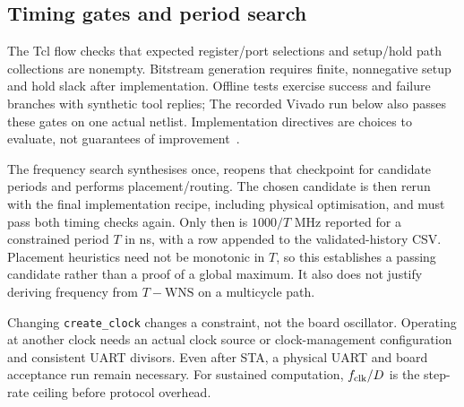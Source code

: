 \subsection{Timing gates and period search}
\label{sec:fmax}

The Tcl flow checks that expected register/port selections and setup/hold
path collections are nonempty. Bitstream generation requires finite,
nonnegative setup and hold slack after implementation. Offline tests exercise
success and failure branches with synthetic tool replies; The recorded Vivado run below also
passes these gates on one actual netlist. Implementation directives are
choices to evaluate, not guarantees of improvement~\cite{ug949}.

The frequency search synthesises once, reopens that checkpoint for candidate
periods and performs placement/routing. The chosen candidate is then rerun
with the final implementation recipe, including physical optimisation, and
must pass both timing checks again. Only then is $1000/T$ MHz reported for a
constrained period $T$ in ns, with a row appended to the validated-history CSV.
Placement heuristics need not be monotonic in $T$, so this establishes a
passing candidate rather than a proof of a global maximum. It also does not
justify deriving frequency from $T-\mathrm{WNS}$ on a multicycle path.

Changing \texttt{create\_clock} changes a constraint, not the board oscillator.
Operating at another clock needs an actual clock source or clock-management
configuration and consistent UART divisors. Even after STA, a physical UART
and board acceptance run remain necessary. For sustained computation,
$f_{\rm clk}/D$ is the step-rate ceiling before protocol overhead.
